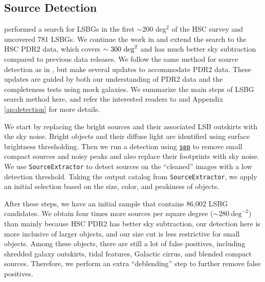\documentclass[twocolumn,astrosymb,twocolappendix]{aastex631}
\newcommand{\code}[1]{\texttt{#1}}
\begin{document}
\begin{CJK*}{UTF8}{gbsn}
\subsection{Source Detection}\label{sec:detection}
 performed a search for LSBGs in the first $\sim 200$ deg$^2$ of the HSC survey and uncovered 781 LSBGs. We continue the work in  and extend the search to the HSC PDR2 data, which covers $\sim 300\ \rm{deg}^{2}$ and has much better sky subtraction compared to previous data releases. We follow the same method for source detection as in , but make several updates to accommodate PDR2 data. These updates are guided by both our understanding of PDR2 data and the completeness tests using mock galaxies. We summarize the main steps of LSBG search method here, and refer the interested readers to  and Appendix \ref{ap:detection} for more details. 

We start by replacing the bright sources and their associated LSB outskirts with the sky noise. Bright objects and their diffuse light are identified using surface brightness thresholding. Then we run a detection using \href{https://sep.readthedocs.io/en/v1.1.x}{\code{sep}} \citep{Barbary2016} to remove small compact sources and noisy peaks and also replace their footprints with sky noise. We use \code{SourceExtractor} to detect sources on the ``cleaned'' images with a low detection threshold. Taking the output catalog from \code{SourceExtractor}, we apply an initial selection based on the size, color, and peakiness of objects. 

After these steps, we have an initial sample that contains 86,002 LSBG candidates. We obtain four times more sources per square degree ($\sim 280\ \mathrm{deg}^{-2}$) than  mainly because HSC PDR2 has better sky subtraction, our detection here is more inclusive of larger objects, and our size cut is less restrictive for small objects. Among these objects, there are still a lot of false positives, including shredded galaxy outskirts, tidal features, Galactic cirrus, and blended compact sources. Therefore, we perform an extra ``deblending'' step to further remove false positives.  



\end{CJK*}
\end{document}
